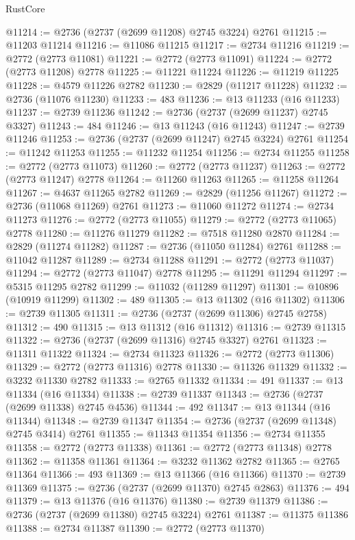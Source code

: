 \begin{lexlean}{RustCore}
\begin{coremodule}
@11214 := @2736 (@2737 (@2699 @11208) @2745 @3224) @2761
@11215 := @11203 @11214
@11216 := @11086 @11215
@11217 := @2734 @11216
@11219 := @2772 (@2773 @11081)
@11221 := @2772 (@2773 @11091)
@11224 := @2772 (@2773 @11208) @2778
@11225 := @11221 @11224
@11226 := @11219 @11225
@11228 := @4579 @11226 @2782
@11230 := @2829 (@11217 @11228)
@11232 := @2736 (@11076 @11230)
@11233 := 483
@11236 := @13 @11233 (@16 @11233)
@11237 := @2739 @11236
@11242 := @2736 (@2737 (@2699 @11237) @2745 @3327)
@11243 := 484
@11246 := @13 @11243 (@16 @11243)
@11247 := @2739 @11246
@11253 := @2736 (@2737 (@2699 @11247) @2745 @3224) @2761
@11254 := @11242 @11253
@11255 := @11232 @11254
@11256 := @2734 @11255
@11258 := @2772 (@2773 @11073)
@11260 := @2772 (@2773 @11237)
@11263 := @2772 (@2773 @11247) @2778
@11264 := @11260 @11263
@11265 := @11258 @11264
@11267 := @4637 @11265 @2782
@11269 := @2829 (@11256 @11267)
@11272 := @2736 (@11068 @11269) @2761
@11273 := @11060 @11272
@11274 := @2734 @11273
@11276 := @2772 (@2773 @11055)
@11279 := @2772 (@2773 @11065) @2778
@11280 := @11276 @11279
@11282 := @7518 @11280 @2870
@11284 := @2829 (@11274 @11282)
@11287 := @2736 (@11050 @11284) @2761
@11288 := @11042 @11287
@11289 := @2734 @11288
@11291 := @2772 (@2773 @11037)
@11294 := @2772 (@2773 @11047) @2778
@11295 := @11291 @11294
@11297 := @5315 @11295 @2782
@11299 := @11032 (@11289 @11297)
@11301 := @10896 (@10919 @11299)
@11302 := 489
@11305 := @13 @11302 (@16 @11302)
@11306 := @2739 @11305
@11311 := @2736 (@2737 (@2699 @11306) @2745 @2758)
@11312 := 490
@11315 := @13 @11312 (@16 @11312)
@11316 := @2739 @11315
@11322 := @2736 (@2737 (@2699 @11316) @2745 @3327) @2761
@11323 := @11311 @11322
@11324 := @2734 @11323
@11326 := @2772 (@2773 @11306)
@11329 := @2772 (@2773 @11316) @2778
@11330 := @11326 @11329
@11332 := @3232 @11330 @2782
@11333 := @2765 @11332
@11334 := 491
@11337 := @13 @11334 (@16 @11334)
@11338 := @2739 @11337
@11343 := @2736 (@2737 (@2699 @11338) @2745 @4536)
@11344 := 492
@11347 := @13 @11344 (@16 @11344)
@11348 := @2739 @11347
@11354 := @2736 (@2737 (@2699 @11348) @2745 @3414) @2761
@11355 := @11343 @11354
@11356 := @2734 @11355
@11358 := @2772 (@2773 @11338)
@11361 := @2772 (@2773 @11348) @2778
@11362 := @11358 @11361
@11364 := @3232 @11362 @2782
@11365 := @2765 @11364
@11366 := 493
@11369 := @13 @11366 (@16 @11366)
@11370 := @2739 @11369
@11375 := @2736 (@2737 (@2699 @11370) @2745 @2863)
@11376 := 494
@11379 := @13 @11376 (@16 @11376)
@11380 := @2739 @11379
@11386 := @2736 (@2737 (@2699 @11380) @2745 @3224) @2761
@11387 := @11375 @11386
@11388 := @2734 @11387
@11390 := @2772 (@2773 @11370)

\end{coremodule}
\end{lexlean}
